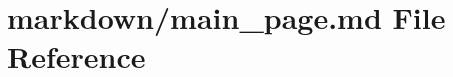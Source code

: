 \hypertarget{main__page_8md}{\section{markdown/main\-\_\-page.md File Reference}
\label{main__page_8md}
}
